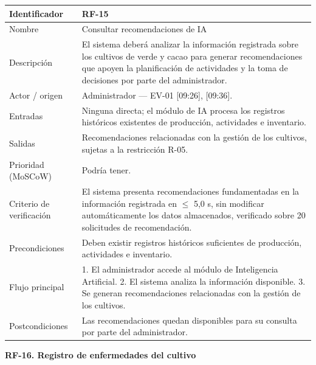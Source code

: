 \documentclass[12pt,a4paper]{article}
\begin{document}
\begin{center}
\begin{longtable}{|p{3.5cm}|p{10.7cm}|}
\hline
Identificador & RF-15 \\
\hline
Nombre & Consultar recomendaciones de IA \\
\hline
Descripción & El sistema deberá analizar la información registrada sobre los cultivos de verde y cacao para generar recomendaciones que apoyen la planificación de actividades y la toma de decisiones por parte del administrador. \\
\hline
Actor / origen & Administrador --- EV-01 [09:26], [09:36]. \\
\hline
Entradas & Ninguna directa; el módulo de IA procesa los registros históricos existentes de producción, actividades e inventario. \\
\hline
Salidas & Recomendaciones relacionadas con la gestión de los cultivos, sujetas a la restricción R-05. \\
\hline
Prioridad (MoSCoW) & Podría tener. \\
\hline
Criterio de verificación & El sistema presenta recomendaciones fundamentadas en la información registrada en $\leq$ 5,0 s, sin modificar automáticamente los datos almacenados, verificado sobre 20 solicitudes de recomendación. \\
\hline
Precondiciones & Deben existir registros históricos suficientes de producción, actividades e inventario. \\
\hline
Flujo principal & 1. El administrador accede al módulo de Inteligencia Artificial. 2. El sistema analiza la información disponible. 3. Se generan recomendaciones relacionadas con la gestión de los cultivos. \\
\hline
Postcondiciones & Las recomendaciones quedan disponibles para su consulta por parte del administrador. \\
\hline
\end{longtable}
\end{center}

\bigskip
\noindent\textbf{RF-16. Registro de enfermedades del cultivo}
\label{tab:RF-16}
\end{document}
